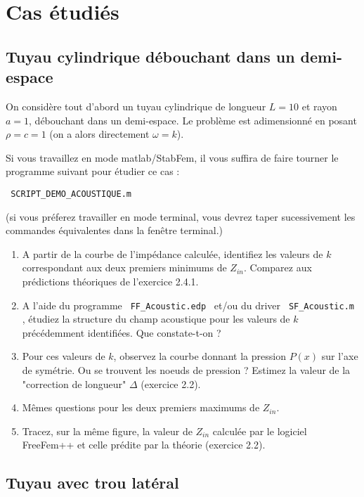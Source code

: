 \documentclass[11pt,a4paper]{article}
\begin{document}
\section{  Cas étudiés }

\subsection{Tuyau cylindrique débouchant dans un demi-espace}

On considère tout d'abord un tuyau cylindrique de longueur $L=10$ et rayon $a = 1$, 
débouchant dans un demi-espace. Le problème est adimensionné en posant $\rho = c =1$ 
(on a alors directement $\omega = k$).

Si vous travaillez en mode matlab/StabFem, il vous suffira de faire tourner le programme suivant pour étudier ce cas :

\verb| SCRIPT_DEMO_ACOUSTIQUE.m |

{\small
(si vous préferez travailler en mode terminal, vous devrez taper sucessivement les commandes équivalentes dans la fenêtre terminal.)
}

\begin{enumerate}


\item A partir de la courbe de l'impédance calculée, identifiez les valeurs de $k$ correspondant aux deux premiers minimums de $Z_{in}$. Comparez aux prédictions théoriques de l'exercice 2.4.1.

\item A l'aide du programme \verb| FF_Acoustic.edp | et/ou du driver \verb| SF_Acoustic.m |,
étudiez la structure du champ acoustique pour les valeurs de $k$ précédemment identifiées. Que constate-t-on ?

\item Pour ces  valeurs de $k$, observez la courbe donnant la pression $P(x)$ sur l'axe de symétrie. Ou se trouvent les noeuds de pression ? Estimez la valeur de la "correction de longueur" $\Delta$ (exercice 2.2).

\item Mêmes questions pour les deux premiers maximums de $Z_{in}$. 


\item Tracez, sur la même figure, la valeur de $Z_{in}$ calculée par le logiciel FreeFem++ et celle prédite par la théorie (exercice 2.2).

\end{enumerate}

\subsection{Tuyau avec trou latéral}
\end{document}
